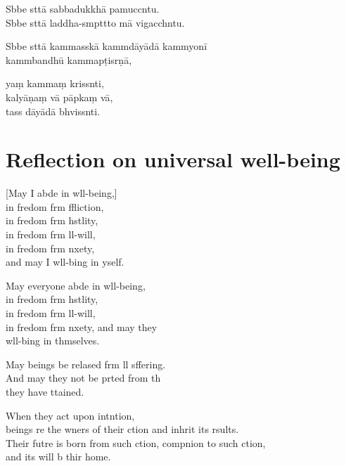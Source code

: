 Sbbe sttā sabbadukkhā pamuccntu.\\
Sbbe sttā laddha-smpttto mā vigacchntu.

Sbbe sttā kammasskā kammdāyādā kammyonī\\
\vin kammbandhū kammapṭisrṇā,

yaṃ kammaṃ krissnti,\\
kalyāṇaṃ vā pāpkaṃ vā,\\
tass dāyādā bhvissnti.

\clearpage

\chapter[Universal well-being]{Reflection on universal well-being}

\begin{leader}
\end{leader}

[May I abde in wll-being,]\\
in fredom frm ffliction,\\
in fredom frm hstlity,\\
in fredom frm ll-will,\\
in fredom frm nxety,\\
and may I  wll-bing in yself.

May everyone abde in wll-being,\\
in fredom frm hstlity,\\
in fredom frm ll-will,\\
in fredom frm nxety, and may they\\
 wll-bing in thmselves.

May  beings be relased frm ll sffering.\\
And may they not be prted from th\\
 they have ttained.

When they act upon intntion,\\
 beings re the wners of their ction and inhrit its rsults.\\
Their futre is born from such ction, compnion to such ction,\\
and its  will b thir home.

